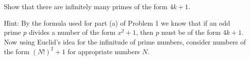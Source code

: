\section{}

Show that there are infinitely many primes of the form $4k+1$. 

Hint: By the formula used for part (a) of Problem 1 we know that if an odd prime
$p$ divides a number of the form $x^2 + 1$, then $p$ must be of the form $4k+1$.
Now using Euclid's idea for the infinitude of prime numbers, consider numbers of
the form $(N!)^2 + 1$ for appropriate numbers $N$.
